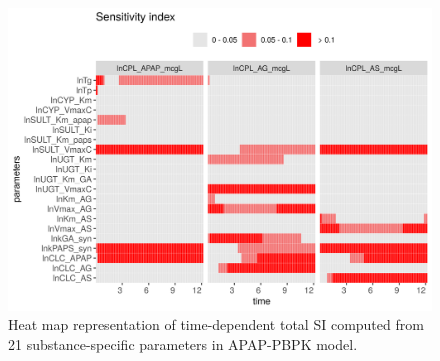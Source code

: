 \documentclass[preprint,12pt, a4paper]{elsarticle}
\begin{document}
\begin{landscape}
\clearpage
\newpage

\begin{figure}
\includegraphics[width=1\linewidth]{example-2} 
\caption{Heat map representation of time-dependent total SI computed from 21 substance-specific parameters in APAP-PBPK model.}
\label{fig:example-2}
\end{figure}

\end{landscape}
\end{document}
